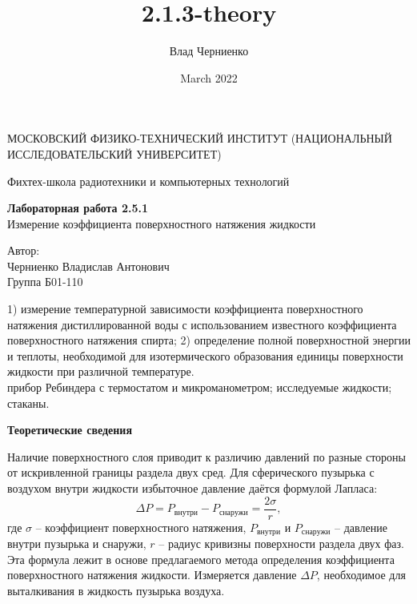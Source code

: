 \documentclass[a4paper, 12pt]{article}
\title{2.1.3-theory}
\author{Влад Черниенко}
\date{March 2022}
\begin{document}
    \begin{titlepage}
    
        \begin{center}
            {\large МОСКОВСКИЙ ФИЗИКО-ТЕХНИЧЕСКИЙ ИНСТИТУТ (НАЦИОНАЛЬНЫЙ ИССЛЕДОВАТЕЛЬСКИЙ УНИВЕРСИТЕТ)}
        \end{center}
        \begin{center}
            {\large Фихтех-школа радиотехники и компьютерных технологий}
        \end{center}
        
        \vspace{4.5cm}
        
        {\huge
            \begin{center}
                {\bf Лабораторная работа 2.5.1}\\
                Измерение коэффициента поверхностного натяжения жидкости
            \end{center}
        }
        
        \vspace{11cm}
        
        \begin{flushright}
            {\LARGE Автор: \\ Черниенко Владислав Антонович \\ \vspace{0.2cm} Группа Б01-110}
        \end{flushright}
        
    \end{titlepage}
    
    
     1) измерение температурной зависимости  коэффициента поверхностного натяжения дистиллированной воды с использованием известного коэффициента поверхностного натяжения спирта; 2) определение полной поверхностной энергии  и теплоты, необходимой для изотермического образования единицы поверхности жидкости при различной температуре.\\
    
     прибор Ребиндера с термостатом и микроманометром; исследуемые жидкости; стаканы.\\
    
    \begin{flushleft}
        {\Large {\bf Теоретические сведения}}
    \end{flushleft}
    
    Наличие поверхностного слоя приводит к различию давлений по разные стороны от искривленной границы раздела двух сред. Для сферического пузырька с воздухом внутри жидкости избыточное давление даётся формулой Лапласа:
    \begin{equation}
        \Delta P = P_{внутри} - P_{снаружи} = \frac{2 \sigma}{r},
        \label{first}
    \end{equation}
    где $\sigma$ – коэффициент поверхностного натяжения, $P_{внутри}$ и $P_{снаружи}$ – давление внутри пузырька и снаружи, $r$ – радиус кривизны поверхности раздела двух фаз. Эта формула лежит в основе предлагаемого метода определения коэффициента поверхностного натяжения жидкости. Измеряется давление $\Delta P$, необходимое для выталкивания в жидкость пузырька воздуха.
    
\end{document}
